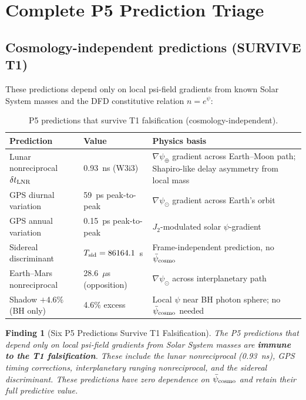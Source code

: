\documentclass[11pt]{article}
\newtheorem{finding}{Finding}
\newcommand{\psicosmo}{\bar{\psi}_{\rm cosmo}}
\begin{document}
\section{Complete P5 Prediction Triage}
\label{sec:P5-triage}

\subsection{Cosmology-independent predictions (SURVIVE T1)}

These predictions depend only on local psi-field gradients from known Solar
System masses and the DFD constitutive relation $n = e^\psi$:

\begin{table}[h]
\centering
\caption{P5 predictions that survive T1 falsification (cosmology-independent).}
\label{tab:P5-survivors}
\begin{tabular}{p{4cm}p{3cm}p{5cm}}
\toprule
\textbf{Prediction} & \textbf{Value} & \textbf{Physics basis} \\
\midrule
Lunar nonreciprocal $\delta t_{\rm LNR}$ & 0.93~ns (W3i3) &
  $\nabla\psi_\oplus$ gradient across Earth--Moon path;
  Shapiro-like delay asymmetry from local mass \\
GPS diurnal variation & 59~ps peak-to-peak &
  $\nabla\psi_\odot$ gradient across Earth's orbit \\
GPS annual variation & 0.15~ps peak-to-peak &
  $J_2$-modulated solar $\psi$-gradient \\
Sidereal discriminant & $T_{\rm sid} = 86164.1$~s &
  Frame-independent prediction, no $\psicosmo$ \\
Earth--Mars nonreciprocal & 28.6~$\mu$s (opposition) &
  $\nabla\psi_\odot$ across interplanetary path \\
Shadow $+4.6\%$ (BH only) & 4.6\% excess &
  Local $\psi$ near BH photon sphere;
  no $\psicosmo$ needed \\
\bottomrule
\end{tabular}
\end{table}

\begin{finding}[Six P5 Predictions Survive T1 Falsification]
\label{find:P5-survivors}
The P5 predictions that depend only on local psi-field gradients from Solar
System masses are \textbf{immune to the T1 falsification}. These include the
lunar nonreciprocal (0.93~ns), GPS timing corrections, interplanetary ranging
nonreciprocal, and the sidereal discriminant. These predictions have zero
dependence on $\psicosmo$ and retain their full predictive value.
\end{finding}
\end{document}
